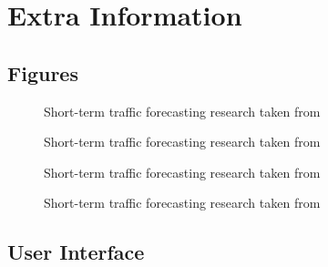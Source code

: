 \chapter{Extra Information}

\section{Figures}
\begin{figure}[h]
	\caption{Short-term traffic forecasting research taken from \cite{Vlahogianni20143}}
	\label{fig:Vlahogianni201431}
\end{figure}

\begin{figure}[ht]
	\caption{Short-term traffic forecasting research taken from \cite{Vlahogianni20143}}
	\label{fig:Vlahogianni201432}
\end{figure}

\begin{figure}[ht]
	\caption{Short-term traffic forecasting research taken from \cite{Vlahogianni20143}}
	\label{fig:Vlahogianni201433}
\end{figure}

\begin{figure}[ht]
	\caption{Short-term traffic forecasting research taken from \cite{Vlahogianni20143}}
\label{fig:Vlahogianni201434}
\end{figure}

\FloatBarrier
\section{User Interface}
\begin{figure}[ht!]
	\caption{}
\label{fig:ui1}
\end{figure}

\begin{figure}[ht!]
	\caption{}
\label{fig:ui2}
\end{figure}

